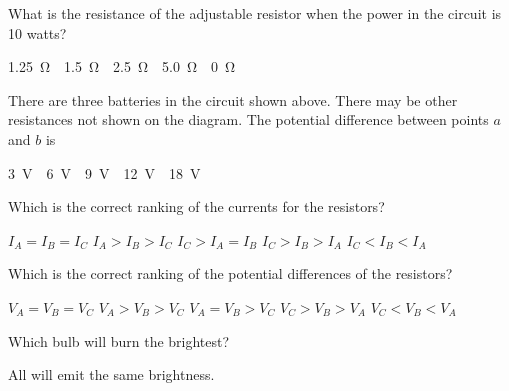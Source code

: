 \documentclass{../../oss-classkick-exam}
\begin{document}
\begin{multicols}{2}
\begin{questions}
    \question What is the resistance of the adjustable resistor when the power
    in the circuit is 10 watts?
    \label{adjust2}
    \begin{choices}
      \choice\SI{1.25}\ohm
      \choice\SI{1.5}\ohm
      \choice\SI{2.5}\ohm
      \choice\SI{5.0}\ohm
      \choice\SI{0}\ohm
    \end{choices}    
    
    \question There are three batteries in the circuit shown above. There may
    be other resistances not shown on the diagram. The potential difference
    between points $a$ and $b$ is
    \begin{choices}
      \choice\SI{3}\volt
      \choice\SI{6}\volt
      \choice\SI{9}\volt
      \choice\SI{12}\volt
      \choice\SI{18}\volt
    \end{choices}


    \question Which is the correct ranking of the currents for the resistors?
    \label{series1}
    \begin{choices}
      \choice$I_A=I_B=I_C$
      \choice$I_A>I_B>I_C$
      \choice$I_C>I_A=I_B$
      \choice$I_C>I_B>I_A$
      \choice$I_C<I_B<I_A$
    \end{choices}

    \question Which is the correct ranking of the potential differences of the
    resistors?
    \label{series2}
    \begin{choices}
      \choice $V_A=V_B=V_C$
      \choice $V_A>V_B>V_C$
      \choice $V_A=V_B>V_C$
      \choice $V_C>V_B>V_A$
      \choice $V_C<V_B<V_A$
    \end{choices}    
    \columnbreak
    
    \question Which bulb will burn the brightest?
    \label{bulb1}
    \begin{choices}
       \choice All will emit the same brightness.
    \end{choices}
    \vspace{.7in}
    

\end{questions}
\end{multicols}
\end{document}
